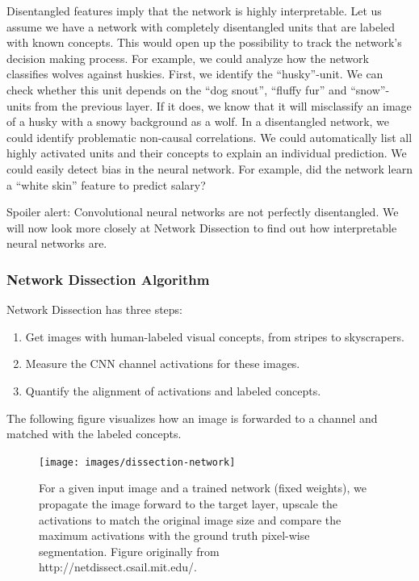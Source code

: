 \documentclass[
  11pt,
]{scrbook}
\providecommand{\tightlist}{%
  \setlength{\itemsep}{0pt}\setlength{\parskip}{0pt}}
\begin{document}
Disentangled features imply that the network is highly interpretable.
Let us assume we have a network with completely disentangled units that are labeled with known concepts.
This would open up the possibility to track the network's decision making process.
For example, we could analyze how the network classifies wolves against huskies.
First, we identify the ``husky''-unit.
We can check whether this unit depends on the ``dog snout'', ``fluffy fur'' and ``snow''-units from the previous layer.
If it does, we know that it will misclassify an image of a husky with a snowy background as a wolf.
In a disentangled network, we could identify problematic non-causal correlations.
We could automatically list all highly activated units and their concepts to explain an individual prediction.
We could easily detect bias in the neural network.
For example, did the network learn a ``white skin'' feature to predict salary?

Spoiler alert: Convolutional neural networks are not perfectly disentangled.
We will now look more closely at Network Dissection to find out how interpretable neural networks are.

\hypertarget{network-dissection-algorithm}{%
\subsubsection{Network Dissection Algorithm}\label{network-dissection-algorithm}}

Network Dissection has three steps:

\begin{enumerate}
\def\labelenumi{\arabic{enumi}.}
\tightlist
\item
  Get images with human-labeled visual concepts, from stripes to skyscrapers.
\item
  Measure the CNN channel activations for these images.
\item
  Quantify the alignment of activations and labeled concepts.
\end{enumerate}

The following figure visualizes how an image is forwarded to a channel and matched with the labeled concepts.

\begin{figure}

{\centering \texttt{[image: images/dissection-network]} 

}

\caption{For a given input image and a trained network (fixed weights), we propagate the image forward to the target layer, upscale the activations to match the original image size and compare the maximum activations with the ground truth pixel-wise segmentation. Figure originally from http://netdissect.csail.mit.edu/.}\label{fig:unnamed-chunk-54}
\end{figure}
\end{document}
